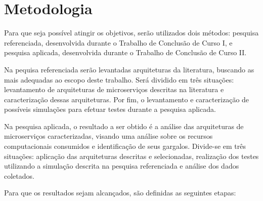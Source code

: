 \section{Metodologia}
\label{met}

Para que seja possível atingir os objetivos, serão utilizados dois métodos: pesquisa referenciada, desenvolvida durante o Trabalho de Conclusão de Curso I, e pesquisa aplicada, desenvolvida durante o Trabalho de Conclusão de Curso II.

Na pequisa referenciada serão levantadas arquiteturas da literatura, buscando as mais adequadas ao escopo deste trabalho. Será dividido em três situações: levantamento de arquiteturas de microserviços descritas na literatura e caracterização dessas arquiteturas.
%
Por fim, o levantamento e caracterização de possíveis simulações para efetuar testes durante a pesquisa aplicada.

Na pesquisa aplicada, o resultado a ser obtido é a análise das arquiteturas de microserviços caracterizadas, visando uma análise sobre os recursos computacionais consumidos e identificação de seus gargalos.
%
Divide-se em três situações: aplicação das arquiteturas descritas e selecionadas, realização dos testes utilizando a simulação descrita na pesquisa referenciada e análise dos dados coletados.

Para que os resultados sejam alcançados, são definidas as seguintes etapas:

